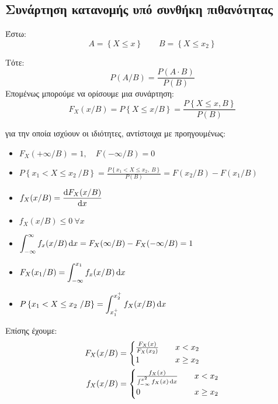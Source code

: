 \documentclass[11pt,a4paper,notitlepage,fleqn,draft]{article}
\begin{document}
	\subsection{Συνάρτηση κατανομής υπό συνθήκη πιθανότητας}
	Έστω:
	\[
	A = \left\lbrace X \leq x \right\rbrace
	\qquad
	B = \left\lbrace X \leq x_2 \right\rbrace
	\]
	
	Τότε:
	\[
	P(A/B) = \frac{P(A\cdot B)}{P(B)}
	\]
	Επομένως μπορούμε να ορίσουμε μια συνάρτηση:
	\[
	\boxed{
		F_X(x/B) = P\left\lbrace X\leq x/B \right\rbrace
		= \frac{P\left\lbrace X\leq x, B \right\rbrace}{P(B)}
		}
	\]
	
	για την οποία ισχύουν οι ιδιότητες, αντίστοιχα με προηγουμένως:

	\begin{itemize}
		\item \( F_X(+\infty/B) = 1, \quad F(-\infty/B) = 0 \)
		\item \( \displaystyle
		P\left\lbrace x_1<X\leq x_2\ /B \right\rbrace
		=\frac{P\left\lbrace x_1 < X\leq x_2,\ B \right\rbrace}{P(B)}
		=F(x_2/B) - F(x_1/B) \)
		\item \( \displaystyle f_X(x/B) = \frac{\mathop{}\!\mathrm{d} F_X(x/B)}{\mathop{}\!\mathrm{d} x} \)
		\item \( f_X(x/B) \leq 0 \ \forall x \)
		\item \( \displaystyle
		\int_{-\infty}^{\infty} f_x(x/B) \mathop{}\!\mathrm{d} x = F_X(\infty/B)
		- F_X(-\infty/B) = 1 \)
		\item \( \displaystyle F_X(x_1/B) = \int_{-\infty}^{x_1} f_x(x/B)\mathop{}\!\mathrm{d} x \)
		\item \( \displaystyle P \left\lbrace x_1<X\leq x_2\ /B \right\rbrace
		= \int_{x_1^+}^{x_2^+} f_X(x/B)\mathop{}\!\mathrm{d} x \)
	\end{itemize}

	Επίσης έχουμε:
	\begin{align*}
		F_X(x/B) &= \begin{cases}
		\frac{F_X(x)}{F_X(x_2)} &\quad x<x_2 \\
		1 &\quad x\geq x_2
		\end{cases} \\
		f_X(x/B) &= \begin{cases}
		\frac{f_X(x)}{\int_{-\infty}^{x^2} f_X(x) \mathop{}\!\mathrm{d} x}
		&\quad x<x_2 \\ 0 &\quad x \geq x_2
		\end{cases}
	\end{align*}
\end{document}
